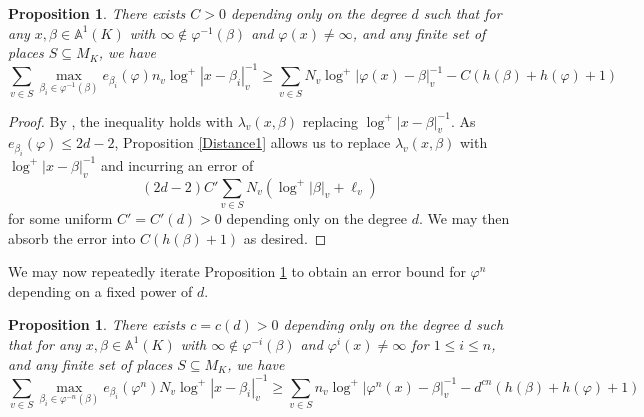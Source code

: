 \documentclass[10pt, reqno]{amsart}
\newcommand{\bb}{\mathbb}
\newcommand{\vphi}{\varphi}
\numberwithin{theorem}{section}
\newtheorem{proposition}[theorem]{Proposition}
\numberwithin{equation}{section}
\numberwithin{example}{section}
\numberwithin{definition}{section}
\begin{document}
\begin{proposition} \label{HsiaSilvermanImplicit1}
There exists $C > 0$ depending only on the degree $d$ such that for any $x,\beta \in \bb{A}^1(K)$ with $\infty \not \in \vphi^{-1}(\beta)$ and $\vphi(x) \not = \infty$, and any finite set of places $S \subseteq M_K$, we have 
$$\sum_{v \in S} \max_{\beta_i \in \vphi^{-1}(\beta)} e_{\beta_i}(\vphi) n_v \log^+|x - \beta_i|^{-1}_v \geq \sum_{v \in S} N_v \log^+|\vphi(x)-\beta|^{-1}_v - C(h(\beta) + h(\vphi)+1)$$
\end{proposition}

\begin{proof}
By \cite[Proposition 7]{HS11}, the inequality holds with $\lambda_v(x,\beta)$ replacing $\log^+|x-\beta|^{-1}_v$. As $e_{\beta_i}(\vphi) \leq 2d-2$, Proposition \ref{Distance1} allows us to replace $\lambda_v(x,\beta)$ with $\log^+|x-\beta|^{-1}_v$ and incurring an error of 
$$(2d-2) C' \sum_{v \in S} N_v(\log^+|\beta|_v+\ell_v)$$
for some uniform $C' = C'(d) > 0$ depending only on the degree $d$. We may then absorb the error into $C(h(\beta)+1)$ as desired.
\end{proof}

We may now repeatedly iterate Proposition \ref{HsiaSilvermanImplicit1} to obtain an error bound for $\vphi^n$ depending on a fixed power of $d$.


\begin{proposition} \label{HsiaSilvermanImplicit2}
There exists $c = c(d) > 0$ depending only on the degree $d$ such that for any $x,\beta \in \bb{A}^1(K)$ with $\infty \not \in \vphi^{-i}(\beta)$ and $\vphi^i(x) \not = \infty$ for $1 \leq i \leq n$, and any finite set of places $S \subseteq M_K$, we have 
$$\sum_{v \in S} \max_{\beta_i \in \vphi^{-n}(\beta)} e_{\beta_i}(\vphi^n) N_v \log^+|x - \beta_i|^{-1}_v \geq \sum_{v \in S} n_v \log^+|\vphi^n(x)-\beta|^{-1}_v - d^{cn}(h(\beta) + h(\vphi)+1)$$
\end{proposition}
\end{document}
